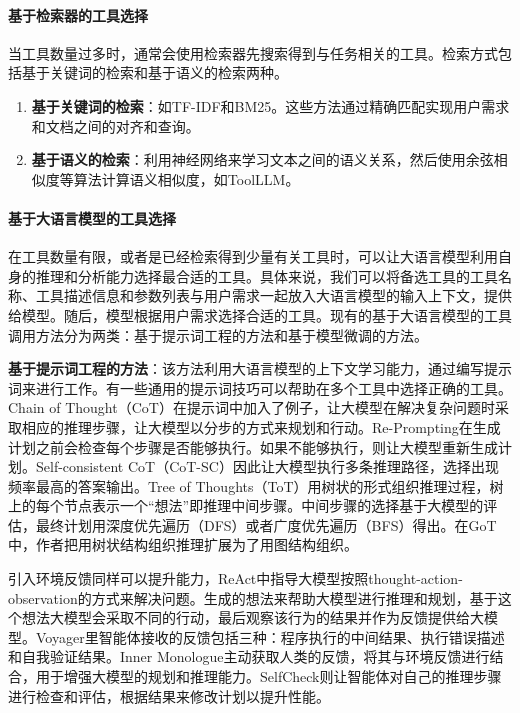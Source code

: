 \paragraph{基于检索器的工具选择} 
当工具数量过多时，通常会使用检索器先搜索得到与任务相关的工具。检索方式包括基于关键词的检索和基于语义的检索两种。

\begin{enumerate}
    \item \textbf{基于关键词的检索}：如TF-IDF\cite{Jones1972}和BM25\cite{Robertson2009}。这些方法通过精确匹配实现用户需求和文档之间的对齐和查询。
    \item \textbf{基于语义的检索}：利用神经网络来学习文本之间的语义关系，然后使用余弦相似度等算法计算语义相似度，如ToolLLM\cite{Qin2023}。
\end{enumerate}

\paragraph{基于大语言模型的工具选择} 

在工具数量有限，或者是已经检索得到少量有关工具时，可以让大语言模型利用自身的推理和分析能力选择最合适的工具。具体来说，我们可以将备选工具的工具名称、工具描述信息和参数列表与用户需求一起放入大语言模型的输入上下文，提供给模型。随后，模型根据用户需求选择合适的工具。现有的基于大语言模型的工具调用方法分为两类：基于提示词工程的方法和基于模型微调的方法。

\textbf{基于提示词工程的方法}：该方法利用大语言模型的上下文学习能力，通过编写提示词来进行工作。有一些通用的提示词技巧可以帮助在多个工具中选择正确的工具。Chain of Thought（CoT）\cite{Wang2023a}在提示词中加入了例子，让大模型在解决复杂问题时采取相应的推理步骤，让大模型以分步的方式来规划和行动。Re-Prompting\cite{Raman2022}在生成计划之前会检查每个步骤是否能够执行。如果不能够执行，则让大模型重新生成计划。Self-consistent CoT（CoT-SC）\cite{}因此让大模型执行多条推理路径，选择出现频率最高的答案输出。Tree of Thoughts（ToT）\cite{Yao2023a}用树状的形式组织推理过程，树上的每个节点表示一个“想法”即推理中间步骤。中间步骤的选择基于大模型的评估，最终计划用深度优先遍历（DFS）或者广度优先遍历（BFS）得出。在GoT\cite{Besta2023}中，作者把用树状结构组织推理扩展为了用图结构组织。

引入环境反馈同样可以提升能力，ReAct\cite{Yao2023b}中指导大模型按照thought-action-observation的方式来解决问题。生成的想法来帮助大模型进行推理和规划，基于这个想法大模型会采取不同的行动，最后观察该行为的结果并作为反馈提供给大模型。Voyager\cite{Wang2023b}里智能体接收的反馈包括三种：程序执行的中间结果、执行错误描述和自我验证结果。Inner Monologue\cite{Huang2022}主动获取人类的反馈，将其与环境反馈进行结合，用于增强大模型的规划和推理能力。SelfCheck\cite{Miao2023}则让智能体对自己的推理步骤进行检查和评估，根据结果来修改计划以提升性能。

